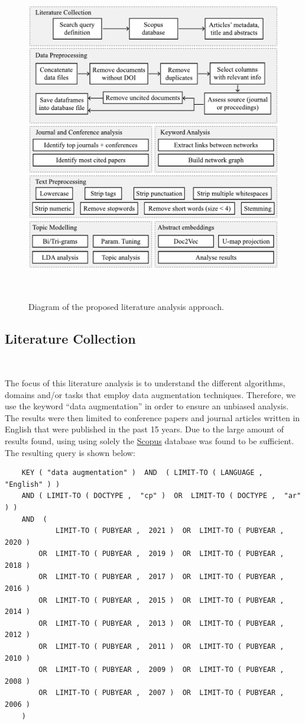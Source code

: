 \documentclass[parskip=full]{scrartcl}
\begin{document}
\begin{figure}[H]
	\centering
	\includegraphics[width=.75\linewidth]{../analysis/slr_diagram}
    \caption{Diagram of the proposed literature analysis approach.
    }~\label{fig:slr_diagram}
\end{figure}

\subsection{Literature Collection}~\label{sec:lit_collection}

The focus of this literature analysis is to understand the different
algorithms, domains and/or tasks that employ data augmentation techniques.
Therefore, we use the keyword ``data augmentation'' in order to ensure an
unbiased analysis. The results were then limited to conference papers and
journal articles written in English that were published in the past 15 years.
Due to the large amount of results found, using using solely the
\href{https://www.scopus.com/}{Scopus} database was found to be sufficient.
The resulting query is shown below:

\begin{verbatim}
    KEY ( "data augmentation" )  AND  ( LIMIT-TO ( LANGUAGE ,  "English" ) )  
    AND ( LIMIT-TO ( DOCTYPE ,  "cp" )  OR  LIMIT-TO ( DOCTYPE ,  "ar" ) )  
    AND  (
            LIMIT-TO ( PUBYEAR ,  2021 )  OR  LIMIT-TO ( PUBYEAR ,  2020 )  
        OR  LIMIT-TO ( PUBYEAR ,  2019 )  OR  LIMIT-TO ( PUBYEAR ,  2018 )  
        OR  LIMIT-TO ( PUBYEAR ,  2017 )  OR  LIMIT-TO ( PUBYEAR ,  2016 )  
        OR  LIMIT-TO ( PUBYEAR ,  2015 )  OR  LIMIT-TO ( PUBYEAR ,  2014 )  
        OR  LIMIT-TO ( PUBYEAR ,  2013 )  OR  LIMIT-TO ( PUBYEAR ,  2012 )  
        OR  LIMIT-TO ( PUBYEAR ,  2011 )  OR  LIMIT-TO ( PUBYEAR ,  2010 )  
        OR  LIMIT-TO ( PUBYEAR ,  2009 )  OR  LIMIT-TO ( PUBYEAR ,  2008 )  
        OR  LIMIT-TO ( PUBYEAR ,  2007 )  OR  LIMIT-TO ( PUBYEAR ,  2006 ) 
    )  
\end{verbatim}
\end{document}
